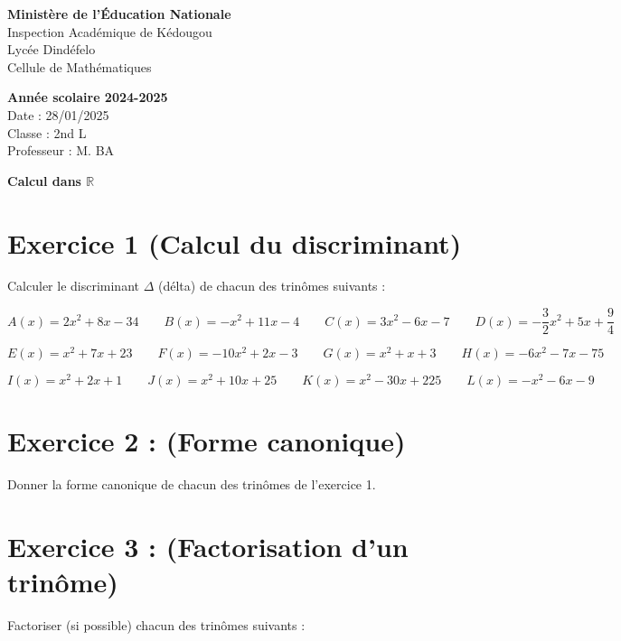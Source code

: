 \documentclass[12pt]{article}
\newcounter{exercice}
\begin{document}
\noindent
\begin{minipage}[t]{0.48\textwidth}
\raggedright
\textbf{Ministère de l'Éducation Nationale}\\
Inspection Académique de Kédougou\\
Lycée Dindéfelo\\
Cellule de Mathématiques
\end{minipage}
\hfill
\begin{minipage}[t]{0.48\textwidth}
\raggedleft
\textbf{Année scolaire 2024-2025}\\
Date : 28/01/2025\\
Classe : 2nd L\\
Professeur : M. BA
\end{minipage}

\vspace{0.5cm}

\begin{center}
\textbf{Calcul dans $\mathbb{R}$}
\end{center}

\section*{Exercice 1 (Calcul du discriminant)}

Calculer le discriminant \(\Delta\) (délta) de chacun des trinômes suivants :

\[ A(x) = 2x^2 + 8x - 34 \quad\quad B(x) = -x^2 + 11x - 4  \quad\quad C(x) = 3x^2 - 6x - 7 \quad\quad D(x) = -\frac{3}{2}x^2 + 5x + \frac{9}{4} \] 

\[ E(x) = x^2 + 7x + 23 \quad\quad F(x) = -10x^2 + 2x - 3 \quad\quad G(x) = x^2 + x + 3  \quad\quad H(x) = -6x^2 - 7x - 75 \] 
   
\[I(x) = x^2 + 2x + 1 \quad\quad J(x) = x^2 + 10x + 25 \quad\quad  K(x) = x^2 - 30x + 225 \quad\quad L(x) = -x^2 - 6x - 9 \]      

\section*{Exercice 2 : (Forme canonique)}

Donner la forme canonique de chacun des trinômes de l’exercice 1.

\section*{Exercice 3 : (Factorisation d’un trinôme)}

Factoriser (si possible) chacun des trinômes suivants :
\end{document}
